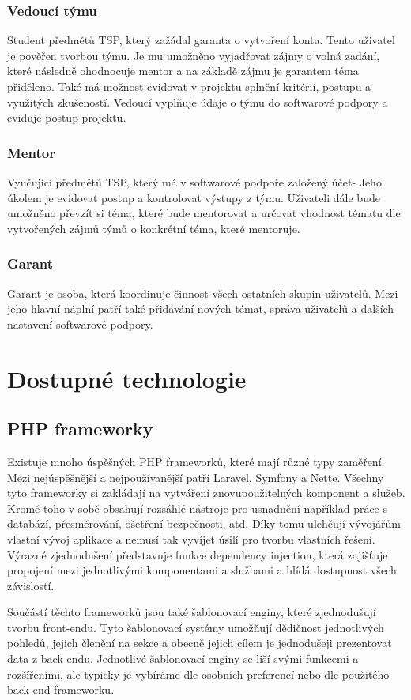\documentclass[czech,BP]{thesiskiv}
\begin{document}
	\subsection{Vedoucí týmu}
		\par Student předmětů TSP, který zažádal garanta o vytvoření konta. Tento uživatel je pověřen tvorbou týmu. Je mu umožněno vyjadřovat zájmy o volná zadání, které následně ohodnocuje mentor a na základě zájmu je garantem téma přiděleno. Také má možnost evidovat v projektu splnění kritérií, postupu a využitých zkušeností. Vedoucí vyplňuje údaje o týmu do softwarové podpory a eviduje postup projektu.
	\subsection{Mentor}
		\par Vyučující předmětů TSP, který má v softwarové podpoře založený účet- Jeho úkolem je evidovat postup a kontrolovat výstupy z týmu. Uživateli dále bude umožněno převzít si téma, které bude mentorovat a určovat vhodnost tématu dle vytvořených zájmů týmů o konkrétní téma, které mentoruje.
	\subsection{Garant}
		\par Garant je osoba, která koordinuje činnost všech ostatních skupin uživatelů. Mezi jeho hlavní náplní patří také přidávání nových témat, správa uživatelů a dalších nastavení softwarové podpory.

\chapter{Dostupné technologie}
\section{PHP frameworky}
	\par Existuje mnoho úspěšných PHP frameworků, které mají různé typy zaměření. Mezi nejúspěšnější a nejpoužívanější patří Laravel, Symfony a Nette. Všechny tyto frameworky si zakládají na vytváření znovupoužitelných komponent a služeb. Kromě toho v sobě obsahují rozsáhlé nástroje pro usnadnění například práce s databází, přesměrování, ošetření bezpečnosti, atd. Díky tomu ulehčují vývojářům vlastní vývoj aplikace a nemusí tak vyvíjet úsilí pro tvorbu vlastních řešení. Výrazné zjednodušení představuje funkce dependency injection, která zajišťuje propojení mezi jednotlivými komponentami a službami a hlídá dostupnost všech závislostí.
	\par Součástí těchto frameworků jsou také šablonovací enginy, které zjednodušují tvorbu front-endu. Tyto šablonovací systémy umožňují dědičnost jednotlivých pohledů, jejich členění na sekce a obecně jejich cílem je jednodušeji prezentovat data z back-endu. Jednotlivé šablonovací enginy se liší svými funkcemi a rozšířeními, ale typicky je vybíráme dle osobních preferencí nebo dle použitého back-end frameworku.
\end{document}

